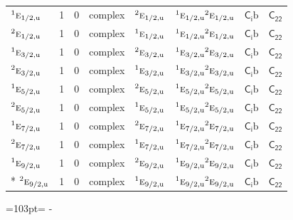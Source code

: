 \documentclass[10pt,a4paper]{article}
\newcommand{\needspace}[1]{\par\penalty-100\begingroup\dimen0=#1\relax\dimen2=\pagegoal
  \advance\dimen2-\pagetotal\ifdim\dimen0>\dimen2\relax\ifdim\dimen2>0pt\vfil\break\fi\fi
  \endgroup}
\numberwithin{equation}{section}
\newcommand{\grp}[1]{\mathsf{#1}}
\newcommand{\irr}[1]{\text{\normalfont\scshape #1}}
\newcommand{\conjpair}[1]{{}^{#1}}
\newcommand{\ptag}[1]{\mathrm{#1}}
\newcommand{\secondclass}{\mathrm{b}}
\begin{document}
{\begin{longtable}{@{}lrrlllll@{}}
$\conjpair{1}\irr{e}_{1/2,\ptag{u}}$ & 1 & $0$ & complex & $\conjpair{2}\irr{e}_{1/2,\ptag{u}}$ & $\conjpair{1}\irr{e}_{1/2,\ptag{u}}\conjpair{2}\irr{e}_{1/2,\ptag{u}}$ & \href{S2b.pdf}{$\grp{C_{i}}\secondclass$} & $\grp{C_{22}}$\\
$\conjpair{2}\irr{e}_{1/2,\ptag{u}}$ & 1 & $0$ & complex & $\conjpair{1}\irr{e}_{1/2,\ptag{u}}$ & $\conjpair{1}\irr{e}_{1/2,\ptag{u}}\conjpair{2}\irr{e}_{1/2,\ptag{u}}$ & \href{S2b.pdf}{$\grp{C_{i}}\secondclass$} & $\grp{C_{22}}$\\
$\conjpair{1}\irr{e}_{3/2,\ptag{u}}$ & 1 & $0$ & complex & $\conjpair{2}\irr{e}_{3/2,\ptag{u}}$ & $\conjpair{1}\irr{e}_{3/2,\ptag{u}}\conjpair{2}\irr{e}_{3/2,\ptag{u}}$ & \href{S2b.pdf}{$\grp{C_{i}}\secondclass$} & $\grp{C_{22}}$\\
$\conjpair{2}\irr{e}_{3/2,\ptag{u}}$ & 1 & $0$ & complex & $\conjpair{1}\irr{e}_{3/2,\ptag{u}}$ & $\conjpair{1}\irr{e}_{3/2,\ptag{u}}\conjpair{2}\irr{e}_{3/2,\ptag{u}}$ & \href{S2b.pdf}{$\grp{C_{i}}\secondclass$} & $\grp{C_{22}}$\\
$\conjpair{1}\irr{e}_{5/2,\ptag{u}}$ & 1 & $0$ & complex & $\conjpair{2}\irr{e}_{5/2,\ptag{u}}$ & $\conjpair{1}\irr{e}_{5/2,\ptag{u}}\conjpair{2}\irr{e}_{5/2,\ptag{u}}$ & \href{S2b.pdf}{$\grp{C_{i}}\secondclass$} & $\grp{C_{22}}$\\
$\conjpair{2}\irr{e}_{5/2,\ptag{u}}$ & 1 & $0$ & complex & $\conjpair{1}\irr{e}_{5/2,\ptag{u}}$ & $\conjpair{1}\irr{e}_{5/2,\ptag{u}}\conjpair{2}\irr{e}_{5/2,\ptag{u}}$ & \href{S2b.pdf}{$\grp{C_{i}}\secondclass$} & $\grp{C_{22}}$\\
$\conjpair{1}\irr{e}_{7/2,\ptag{u}}$ & 1 & $0$ & complex & $\conjpair{2}\irr{e}_{7/2,\ptag{u}}$ & $\conjpair{1}\irr{e}_{7/2,\ptag{u}}\conjpair{2}\irr{e}_{7/2,\ptag{u}}$ & \href{S2b.pdf}{$\grp{C_{i}}\secondclass$} & $\grp{C_{22}}$\\
$\conjpair{2}\irr{e}_{7/2,\ptag{u}}$ & 1 & $0$ & complex & $\conjpair{1}\irr{e}_{7/2,\ptag{u}}$ & $\conjpair{1}\irr{e}_{7/2,\ptag{u}}\conjpair{2}\irr{e}_{7/2,\ptag{u}}$ & \href{S2b.pdf}{$\grp{C_{i}}\secondclass$} & $\grp{C_{22}}$\\
$\conjpair{1}\irr{e}_{9/2,\ptag{u}}$ & 1 & $0$ & complex & $\conjpair{2}\irr{e}_{9/2,\ptag{u}}$ & $\conjpair{1}\irr{e}_{9/2,\ptag{u}}\conjpair{2}\irr{e}_{9/2,\ptag{u}}$ & \href{S2b.pdf}{$\grp{C_{i}}\secondclass$} & $\grp{C_{22}}$\\*
$\conjpair{2}\irr{e}_{9/2,\ptag{u}}$ & 1 & $0$ & complex & $\conjpair{1}\irr{e}_{9/2,\ptag{u}}$ & $\conjpair{1}\irr{e}_{9/2,\ptag{u}}\conjpair{2}\irr{e}_{9/2,\ptag{u}}$ & \href{S2b.pdf}{$\grp{C_{i}}\secondclass$} & $\grp{C_{22}}$\\
\bottomrule\end{longtable}}
\needspace{103pt}
\end{document}
